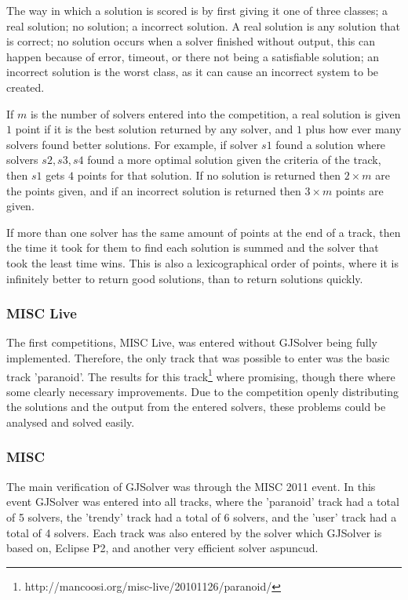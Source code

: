 The way in which a solution is scored is by first giving it one of three classes; a real solution; no solution; a incorrect solution.
A real solution is any solution that is correct; no solution occurs when a solver finished without output, this can happen because of error, timeout, or there not being a satisfiable solution;
an incorrect solution is the worst class, as it can cause an incorrect system to be created.

If $m$ is the number of solvers entered into the competition,
a real solution is given $1$ point if it is the best solution returned by any solver, and $1$ plus how ever many solvers found better solutions.
For example, if solver $s1$ found a solution where solvers $s2,s3,s4$ found a more optimal solution given the criteria of the track, then $s1$ gets $4$ points for that solution.
If no solution is returned then $2\times m$ are the points given, and if an incorrect solution is returned then $3 \times m$ points are given.

If more than one solver has the same amount of points at the end of a track, then the time it took for them to find each solution is summed and the solver that took the least time wins.
This is also a lexicographical order of points, where it is infinitely better to return good solutions, than to return solutions quickly.

\subsubsection{MISC Live}
The first competitions, MISC Live, was entered without GJSolver being fully implemented.
Therefore, the only track that was possible to enter was the basic track 'paranoid'.
The results for this track\footnote{http://mancoosi.org/misc-live/20101126/paranoid/} where promising, though there where some clearly necessary improvements.
Due to the competition openly distributing the solutions and the output from the entered solvers, these problems could be analysed and solved easily.

\subsubsection{MISC}
The main verification of GJSolver was through the MISC 2011 event.
In this event GJSolver was entered into all tracks, where the 'paranoid' track had a total of 5 solvers, the 'trendy' track had a total of 6 solvers, 
and the 'user' track had a total of 4 solvers.
Each track was also entered by the solver which GJSolver is based on, Eclipse P2, and another very efficient solver aspuncud.

